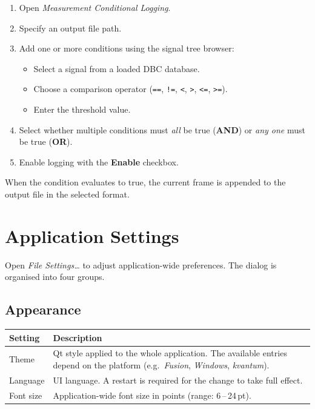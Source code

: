 \documentclass[a4paper,11pt]{article}
\newcommand{\menu}[1]{\textit{#1}}
\newcommand{\ui}[1]{\textbf{#1}}
\begin{document}
\begin{enumerate}
  \item Open \menu{Measurement \textrightarrow{} Conditional Logging}.
  \item Specify an output file path.
  \item Add one or more conditions using the signal tree browser:
    \begin{itemize}
      \item Select a signal from a loaded DBC database.
      \item Choose a comparison operator (\texttt{==}, \texttt{!=}, \texttt{<},
            \texttt{>}, \texttt{<=}, \texttt{>=}).
      \item Enter the threshold value.
    \end{itemize}
  \item Select whether multiple conditions must \textit{all} be true (\ui{AND})
        or \textit{any one} must be true (\ui{OR}).
  \item Enable logging with the \ui{Enable} checkbox.
\end{enumerate}

When the condition evaluates to true, the current frame is appended to the output
file in the selected format.

\section{Application Settings}

Open \menu{File \textrightarrow{} Settings\ldots} to adjust application-wide
preferences. The dialog is organised into four groups.

\subsection*{Appearance}

\begin{table}[h]
  \centering
  \begin{tabularx}{\textwidth}{lX}
    \toprule
    \textbf{Setting} & \textbf{Description} \\
    \midrule
    Theme     & Qt style applied to the whole application.
                The available entries depend on the platform
                (e.g.\ \textit{Fusion}, \textit{Windows}, \textit{kvantum}). \\
    Language  & UI language. A restart is required for the change to take full
                effect. \\
    Font size & Application-wide font size in points (range: 6\,--\,24\,pt). \\
    \bottomrule
  \end{tabularx}
\end{table}
\end{document}
